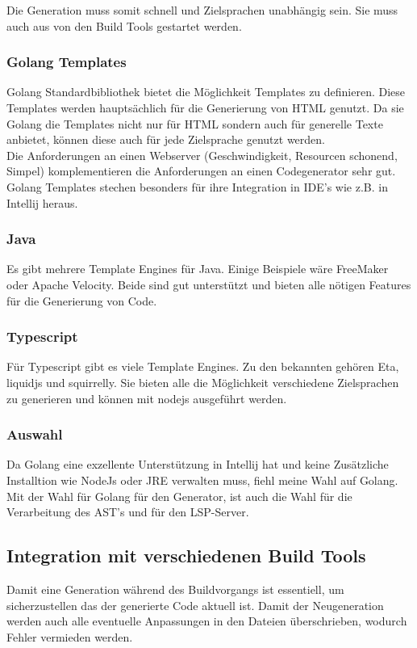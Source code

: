 \documentclass[./einleitung.tex]{subfiles}
\begin{document}
Die Generation muss somit schnell und Zielsprachen unabhängig sein. Sie muss auch aus von den Build Tools gestartet werden.

\subsubsection{Golang Templates}
Golang Standardbibliothek bietet die Möglichkeit Templates zu definieren. Diese Templates werden hauptsächlich für die Generierung von HTML genutzt. Da sie Golang die Templates nicht nur für HTML sondern auch für generelle Texte anbietet, können diese auch für jede Zielsprache genutzt werden. \\
Die Anforderungen an einen Webserver (Geschwindigkeit, Resourcen schonend, Simpel) komplementieren die Anforderungen an einen Codegenerator sehr gut. \\
Golang Templates stechen besonders für ihre Integration in IDE's wie z.B. in Intellij heraus.

\subsubsection{Java}
Es gibt mehrere Template Engines für Java. Einige Beispiele wäre FreeMaker oder Apache Velocity.
Beide sind gut unterstützt und bieten alle nötigen Features für die Generierung von Code.

\subsubsection{Typescript}
Für Typescript gibt es viele Template Engines. Zu den bekannten gehören Eta, liquidjs und squirrelly.
Sie bieten alle die Möglichkeit verschiedene Zielsprachen zu generieren und können mit nodejs ausgeführt werden.

\subsubsection{Auswahl}
Da Golang eine exzellente Unterstützung in Intellij hat und keine Zusätzliche Installtion wie NodeJs oder JRE verwalten muss, fiehl meine Wahl auf Golang.
\newline
Mit der Wahl für Golang für den Generator, ist auch die Wahl für die Verarbeitung des AST's und für den LSP-Server.

\subsection{Integration mit verschiedenen Build Tools}
Damit eine Generation während des Buildvorgangs ist essentiell, um sicherzustellen das der generierte Code aktuell ist. Damit der Neugeneration werden auch alle eventuelle Anpassungen in den Dateien überschrieben, wodurch Fehler vermieden werden.
\end{document}
